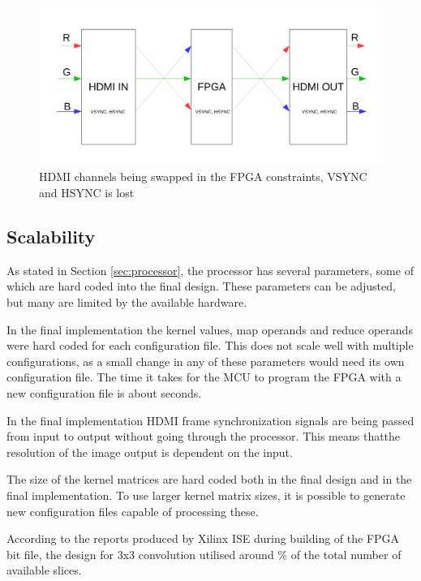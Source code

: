 \begin{figure}[h!]
    \includegraphics[width=\linewidth]{img/hdmi_channel_path.pdf}
    \caption[HDMI channels being swapped in the FPGA constraints]{
        HDMI channels being swapped in the FPGA constraints, VSYNC and HSYNC is lost
    }
    \label{fig:hdmiChannelPath}
\end{figure}

\subsection{Scalability}

As stated in Section \ref{sec:processor}, the processor has several parameters, some of which are hard coded into the final design.
These parameters can be adjusted, but many are limited by the available hardware.

In the final implementation the kernel values, map operands and reduce operands were hard coded for each configuration file.
This does not scale well with multiple configurations, as a small change in any of these parameters would need its own configuration file.
The time it takes for the MCU to program the FPGA with a new configuration file is about \unit[3]{seconds}.

In the final implementation HDMI frame synchronization signals are being passed from input to output without going through the processor.
This means thatthe resolution of the image output is dependent on the input.

The size of the kernel matrices are hard coded both in the final design and in the final implementation.
To use larger kernel matrix sizes, it is possible to generate new configuration files capable of processing these.

According to the reports produced by Xilinx ISE during building of the FPGA bit file, the design for 3x3 convolution utilised around \unit[16]{\%} of the total number of available slices.


